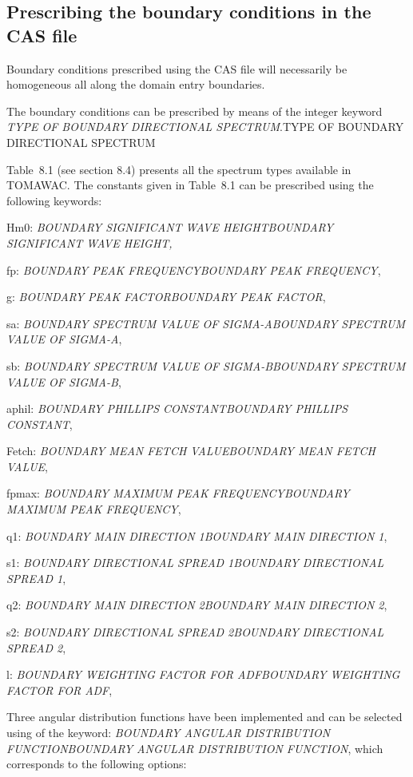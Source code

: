 \subsection{ Prescribing the boundary conditions in the CAS file}

 Boundary conditions prescribed using the CAS file will necessarily be homogeneous all along the domain entry boundaries.

 The boundary conditions can be prescribed by means of the integer keyword \textit{TYPE OF BOUNDARY DIRECTIONAL SPECTRUM}.TYPE OF BOUNDARY DIRECTIONAL SPECTRUM

 Table~8.1 (see section 8.4) presents all the spectrum types available in TOMAWAC. The constants given in Table~8.1 can be prescribed using the following keywords:

 Hm0:  \textit{BOUNDARY SIGNIFICANT WAVE HEIGHTBOUNDARY SIGNIFICANT WAVE HEIGHT,}

 fp:  \textit{BOUNDARY PEAK FREQUENCYBOUNDARY PEAK FREQUENCY},

 g:  \textit{BOUNDARY PEAK FACTORBOUNDARY PEAK FACTOR},

 sa:  \textit{BOUNDARY SPECTRUM VALUE OF SIGMA-ABOUNDARY SPECTRUM VALUE OF SIGMA-A},

 sb:  \textit{BOUNDARY SPECTRUM VALUE OF SIGMA-BBOUNDARY SPECTRUM VALUE OF SIGMA-B},

 aphil:  \textit{BOUNDARY PHILLIPS CONSTANTBOUNDARY PHILLIPS CONSTANT},

 Fetch:  \textit{BOUNDARY MEAN FETCH VALUEBOUNDARY MEAN FETCH VALUE},

 fpmax:  \textit{BOUNDARY MAXIMUM PEAK FREQUENCYBOUNDARY MAXIMUM PEAK FREQUENCY},

 q1:  \textit{BOUNDARY MAIN DIRECTION 1BOUNDARY MAIN DIRECTION 1},

 s1:  \textit{BOUNDARY DIRECTIONAL SPREAD 1BOUNDARY DIRECTIONAL SPREAD 1},

 q2:  \textit{BOUNDARY MAIN DIRECTION 2BOUNDARY MAIN DIRECTION 2},

 s2:  \textit{BOUNDARY DIRECTIONAL SPREAD 2BOUNDARY DIRECTIONAL SPREAD 2},

 l:  \textit{BOUNDARY WEIGHTING FACTOR FOR ADFBOUNDARY WEIGHTING FACTOR FOR ADF},

 Three angular distribution functions have been implemented and can be selected using of the keyword: \textit{BOUNDARY ANGULAR DISTRIBUTION FUNCTIONBOUNDARY ANGULAR DISTRIBUTION FUNCTION}, which corresponds to the following options:

